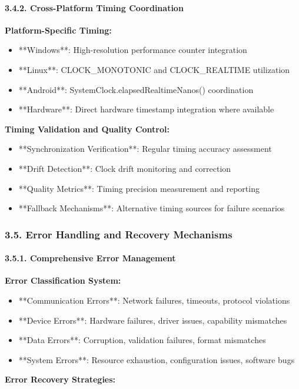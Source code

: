 \documentclass[11pt,a4paper]{article}
\begin{document}
\paragraph{3.4.2. Cross-Platform Timing Coordination}

\textbf{Platform-Specific Timing:}

\begin{itemize}
\item **Windows**: High-resolution performance counter integration
\item **Linux**: CLOCK_MONOTONIC and CLOCK_REALTIME utilization
\item **Android**: SystemClock.elapsedRealtimeNanos() coordination
\item **Hardware**: Direct hardware timestamp integration where available

\end{itemize}
\textbf{Timing Validation and Quality Control:}

\begin{itemize}
\item **Synchronization Verification**: Regular timing accuracy assessment
\item **Drift Detection**: Clock drift monitoring and correction
\item **Quality Metrics**: Timing precision measurement and reporting
\item **Fallback Mechanisms**: Alternative timing sources for failure scenarios

\end{itemize}
\subsubsection{3.5. Error Handling and Recovery Mechanisms}

\paragraph{3.5.1. Comprehensive Error Management}

\textbf{Error Classification System:}

\begin{itemize}
\item **Communication Errors**: Network failures, timeouts, protocol violations
\item **Device Errors**: Hardware failures, driver issues, capability mismatches
\item **Data Errors**: Corruption, validation failures, format mismatches
\item **System Errors**: Resource exhaustion, configuration issues, software bugs

\end{itemize}
\textbf{Error Recovery Strategies:}
\end{document}
